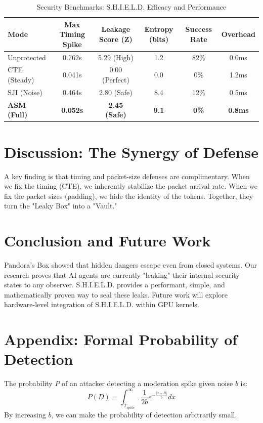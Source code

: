 \documentclass[conference]{IEEEtran}
\begin{document}
\begin{table}[htbp]
\caption{Security Benchmarks: S.H.I.E.L.D. Efficacy and Performance}
\begin{center}
\begin{tabular}{@{}lccccc@{}}
\toprule
\textbf{Mode} & \textbf{Max Timing Spike} & \textbf{Leakage Score (Z)} & \textbf{Entropy (bits)} & \textbf{Success Rate} & \textbf{Overhead} \\ \midrule
Unprotected   & 0.762s                    & 5.29 (High)                & 1.2                     & 82\%                  & 0.0ms             \\
CTE (Steady)  & 0.041s                    & 0.00 (Perfect)             & 0.0                     & 0\%                   & 1.2ms             \\
SJI (Noise)   & 0.464s                    & 2.80 (Safe)                & 8.4                     & 12\%                  & 0.5ms             \\
\textbf{ASM (Full)} & \textbf{0.052s}           & \textbf{2.45 (Safe)}       & \textbf{9.1}            & \textbf{0\%}          & \textbf{0.8ms}    \\ \bottomrule
\end{tabular}
\end{center}
\end{table}

\section{Discussion: The Synergy of Defense}
A key finding is that timing and packet-size defenses are complimentary. When we fix the timing (CTE), we inherently stabilize the packet arrival rate. When we fix the packet sizes (padding), we hide the identity of the tokens. Together, they turn the "Leaky Box" into a "Vault."

\section{Conclusion and Future Work}
Pandora's Box showed that hidden dangers escape even from closed systems. Our research proves that AI agents are currently "leaking" their internal security states to any observer. S.H.I.E.L.D. provides a performant, simple, and mathematically proven way to seal these leaks. Future work will explore hardware-level integration of S.H.I.E.L.D. within GPU kernels.

\section*{Appendix: Formal Probability of Detection}
The probability $P$ of an attacker detecting a moderation spike given noise $b$ is:
\begin{equation}
P(D) = \int_{T_{spike}}^{\infty} \frac{1}{2b} e^{-\frac{|x-R|}{b}} dx
\end{equation}
By increasing $b$, we can make the probability of detection arbitrarily small.
\end{document}
